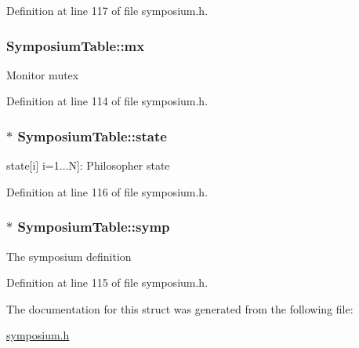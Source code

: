 Definition at line 117 of file symposium.\+h.

\subsubsection[{\texorpdfstring{mx}{mx}}]{ Symposium\+Table\+::mx}\hypertarget{structSymposiumTable_a8c36f26f523e6b2f99f6e70fff098de8}{}\label{structSymposiumTable_a8c36f26f523e6b2f99f6e70fff098de8}
Monitor mutex 

Definition at line 114 of file symposium.\+h.

\subsubsection[{\texorpdfstring{state}{state}}]{$\ast$ Symposium\+Table\+::state}\hypertarget{structSymposiumTable_a70507f28df670d0db2e59fc65309af08}{}\label{structSymposiumTable_a70507f28df670d0db2e59fc65309af08}
state\mbox{[}i\mbox{]} i=1...N\mbox{]}\+: Philosopher state 

Definition at line 116 of file symposium.\+h.

\subsubsection[{\texorpdfstring{symp}{symp}}]{$\ast$ Symposium\+Table\+::symp}\hypertarget{structSymposiumTable_a4089e2778ba23eb79c4785eb5702f70f}{}\label{structSymposiumTable_a4089e2778ba23eb79c4785eb5702f70f}
The symposium definition 

Definition at line 115 of file symposium.\+h.



The documentation for this struct was generated from the following file\+:\begin{DoxyCompactItemize}
\item 
\hyperlink{symposium_8h}{symposium.\+h}\end{DoxyCompactItemize}
